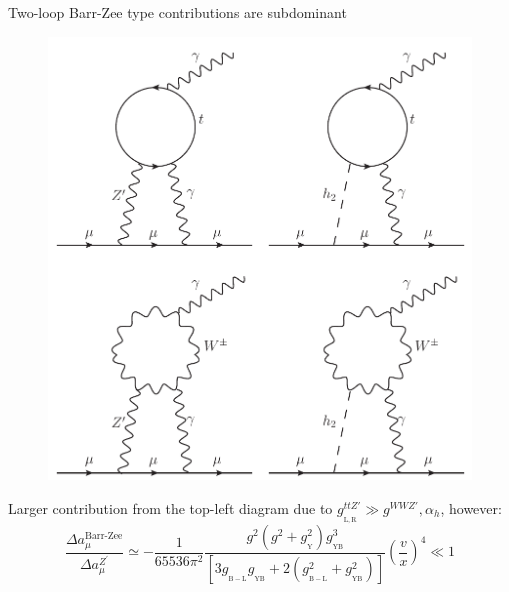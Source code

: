 \documentclass[10pt,xcolor=dvipsnames,mathserif]{beamer}
\renewcommand{\(}{\left(}
\renewcommand{\)}{\right)}
\renewcommand{\[}{\left[}
\renewcommand{\]}{\right]}
\newcommand{\g}[2]{g_{_\mathrm{#1}}^{#2}}
\begin{document}
\begin{frame}
Two-loop Barr-Zee type contributions are subdominant
\begin{figure}[!h]
	\includegraphics[scale=0.32
	]{Barr-Zee.pdf}
\end{figure}	
Larger contribution	from the top-left diagram due to $\g{L,R}{ttZ'} \gg \g{}{WWZ'}, \alpha_h$, however:
\begin{equation*}
\dfrac{\Delta a_\mu^{\text{Barr-Zee}}}{\Delta a_\mu^{Z^\prime}} \simeq -\dfrac{1}{65536 \pi^2}\dfrac{g^2 \(g^2 + \g{Y}{2}\) \g{YB}{3}}{\[3 \g{B-L}{} \g{YB}{}  + 2\(\g{B-L}{2} + \g{YB}{2} \) \] } \(\dfrac{v}{x}\)^4 \ll 1 
\end{equation*}

\end{frame}
\end{document}
